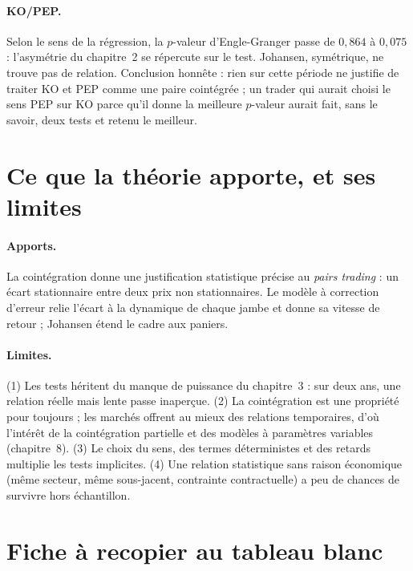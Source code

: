 \paragraph{KO/PEP.} Selon le sens de la régression, la $p$-valeur d'Engle-Granger passe de $0{,}864$ à $0{,}075$ : l'asymétrie du chapitre~2 se répercute sur le test. Johansen, symétrique, ne trouve pas de relation. Conclusion honnête : rien sur cette période ne justifie de traiter KO et PEP comme une paire cointégrée ; un trader qui aurait choisi le sens \og PEP sur KO\fg{} parce qu'il donne la meilleure $p$-valeur aurait fait, sans le savoir, deux tests et retenu le meilleur.

\section{Ce que la théorie apporte, et ses limites}

\paragraph{Apports.} La cointégration donne une justification statistique précise au \emph{pairs trading} : un écart stationnaire entre deux prix non stationnaires. Le modèle à correction d'erreur relie l'écart à la dynamique de chaque jambe et donne sa vitesse de retour ; Johansen étend le cadre aux paniers.

\paragraph{Limites.} (1) Les tests héritent du manque de puissance du chapitre~3 : sur deux ans, une relation réelle mais lente passe inaperçue. (2) La cointégration est une propriété \og pour toujours\fg{} ; les marchés offrent au mieux des relations temporaires, d'où l'intérêt de la cointégration partielle et des modèles à paramètres variables (chapitre~8). (3) Le choix du sens, des termes déterministes et des retards multiplie les tests implicites. (4) Une relation statistique sans raison économique (même secteur, même sous-jacent, contrainte contractuelle) a peu de chances de survivre hors échantillon.

\section{Fiche à recopier au tableau blanc}

